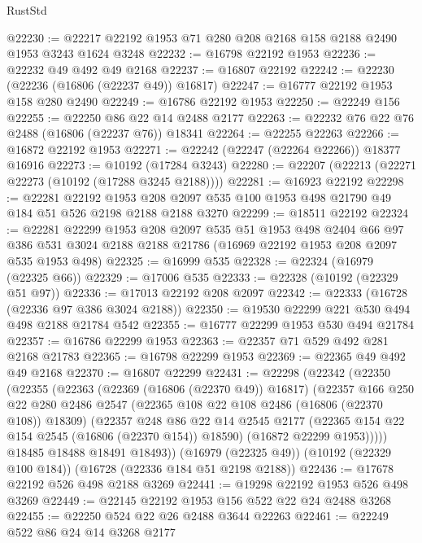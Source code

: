\begin{lexlean}{RustStd}
\begin{coremodule}
@22230 := @22217 @22192 @1953 @71 @280 @208 @2168 @158 @2188 @2490 @1953 @3243 @1624 @3248
@22232 := @16798 @22192 @1953
@22236 := @22232 @49 @492 @49 @2168
@22237 := @16807 @22192
@22242 := @22230 (@22236 (@16806 (@22237 @49)) @16817)
@22247 := @16777 @22192 @1953 @158 @280 @2490
@22249 := @16786 @22192 @1953
@22250 := @22249 @156
@22255 := @22250 @86 @22 @14 @2488 @2177
@22263 := @22232 @76 @22 @76 @2488 (@16806 (@22237 @76)) @18341
@22264 := @22255 @22263
@22266 := @16872 @22192 @1953
@22271 := @22242 (@22247 (@22264 @22266)) @18377 @16916
@22273 := @10192 (@17284 @3243)
@22280 := @22207 (@22213 (@22271 @22273 (@10192 (@17288 @3245 @2188))))
@22281 := @16923 @22192
@22298 := @22281
    @22192
    @1953
    @208
    @2097
    @535
    @100
    @1953
    @498
    @21790
    @49
    @184
    @51
    @526
    @2198
    @2188
    @2188
    @3270
@22299 := @18511 @22192
@22324 := @22281
    @22299
    @1953
    @208
    @2097
    @535
    @51
    @1953
    @498
    @2404
    @66
    @97
    @386
    @531
    @3024
    @2188
    @2188
    @21786
    (@16969 @22192 @1953 @208 @2097 @535 @1953 @498)
@22325 := @16999 @535
@22328 := @22324 (@16979 (@22325 @66))
@22329 := @17006 @535
@22333 := @22328 (@10192 (@22329 @51 @97))
@22336 := @17013 @22192 @208 @2097
@22342 := @22333 (@16728 (@22336 @97 @386 @3024 @2188))
@22350 := @19530 @22299 @221 @530 @494 @498 @2188 @21784 @542
@22355 := @16777 @22299 @1953 @530 @494 @21784
@22357 := @16786 @22299 @1953
@22363 := @22357 @71 @529 @492 @281 @2168 @21783
@22365 := @16798 @22299 @1953
@22369 := @22365 @49 @492 @49 @2168
@22370 := @16807 @22299
@22431 := @22298
    (@22342
      (@22350
        (@22355
          (@22363
            (@22369 (@16806 (@22370 @49)) @16817)
            (@22357
              @166
              @250
              @22
              @280
              @2486
              @2547
              (@22365 @108 @22 @108 @2486 (@16806 (@22370 @108)) @18309)
              (@22357
                @248
                @86
                @22
                @14
                @2545
                @2177
                (@22365 @154 @22 @154 @2545 (@16806 (@22370 @154)) @18590)
                (@16872 @22299 @1953)))))
        @18485
        @18488
        @18491
        @18493))
    (@16979 (@22325 @49))
    (@10192 (@22329 @100 @184))
    (@16728 (@22336 @184 @51 @2198 @2188))
@22436 := @17678 @22192 @526 @498 @2188 @3269
@22441 := @19298 @22192 @1953 @526 @498 @3269
@22449 := @22145 @22192 @1953 @156 @522 @22 @24 @2488 @3268
@22455 := @22250 @524 @22 @26 @2488 @3644 @22263
@22461 := @22249 @522 @86 @24 @14 @3268 @2177

\end{coremodule}
\end{lexlean}
